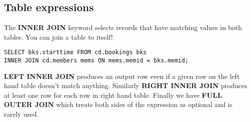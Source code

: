 %

\subsection{Table expressions}
The \textbf{INNER JOIN} keyword selects records that have matching values in both tables.
You can join a table to itself!
\begin{verbatim}
SELECT bks.starttime FROM cd.bookings bks
INNER JOIN cd.members mems ON mems.memid = bks.memid;
\end{verbatim}

\textbf{LEFT INNER JOIN} produces an output row even if a given row on the left hand table doesn't match anything.
Similarly \textbf{RIGHT INNER JOIN} produces at least one row for each row in right hand table.
Finally we have \textbf{FULL OUTER JOIN} which treats both sides of the expression as optional and is rarely used.

%